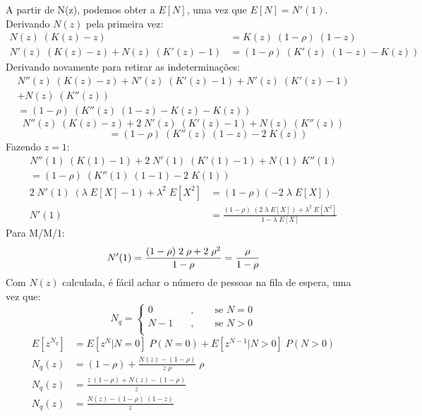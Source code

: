 \documentclass[a4paper]{article}
\newcommand{\E}[1]{E\!\left[#1\right]}
\begin{document}
A partir de N(z),
podemos obter a \(\E{N}\),
uma vez que \(\E{N} = N'(1)\).
Derivando \(N(z)\) pela primeira vez:
\begin{align*}
    N(z) \; (K(z) - z) &= K(z) \; (1 - \rho) \; (1-z) \\
    N'(z) \; (K(z) - z) +  N(z) \; (K'(z) - 1)
        &= (1 - \rho) \; (K'(z) \; (1 - z) - K(z))
\end{align*}
Derivando novamente para retirar as indeterminações:
\begin{align*}
    N''(z) \; (K(z) - z) + N'(z) \; (K'(z) - 1)
        + N'(z) \; (K'(z) - 1) \\
        + N(z) \; (K''(z)) \\
    = (1 - \rho) \; (K''(z) \; (1 - z) - K(z) - K(z))
\end{align*}
\[
   N''(z) \; (K(z) - z) + 2 \; N'(z) \; (K'(z) - 1)
        + N(z) \; (K''(z))
\] \[
    \qquad\qquad \quad
    = (1 - \rho) \; (K''(z) \; (1 - z) - 2 \; K(z))
\]
Fazendo \(z = 1\):
\begin{align*}
    N''(1) \; (K(1) - 1) + 2 \; N'(1) \; (K'(1) - 1)
        + N(1) \; K''(1) \\
        = (1 - \rho) \; (K''(1) \; (1 - 1) - 2 \; K(1))
\end{align*} \begin{align*}
    2 \; N'(1) \; (\lambda \; \E{X} - 1)
        + \lambda^2 \; \E{X^2}
        &= (1 - \rho)(- 2 \; \lambda \; \E{X}) \\
    N'(1) &= \frac{(1 - \rho) \; (2 \; \lambda \; \E{X})
        + \lambda^2 \; \E{X^2}}{1 - \lambda \; \E{X}}
\end{align*}
Para M/M/1:
\[
    N'(1) = \frac{(1 - \rho) \; 2 \; \rho
        + 2 \; \rho^2}{1 - \rho} \\
        = \frac{\rho}{1 - \rho}
\]
Com \(N(z)\) calculada, é fácil achar
o número de pessoas na fila de espera,
uma vez que:
\[
    N_q = \begin{cases}
        0       \quad&, \qquad\text{se } N = 0 \\
        N - 1   \quad&, \qquad\text{se } N > 0 \\
    \end{cases}
\]
\begin{align*}
    \E{z^{N_q}} &= \E{z^N| N = 0} \; P(N = 0)
        + \E{z^{N-1} | N > 0} \;P(N > 0) \\
    N_q(z) &= (1 - \rho) + \frac{N(z) - (1 - \rho)}{z \; \rho}
        \; \rho \\
    N_q(z) &= \frac{z \; (1 - \rho) + N(z) - (1 - \rho)}{z} \\
    N_q(z) &= \frac{N(z) - (1 - \rho) \; (1 - z)}{z} \\
\end{align*}
\end{document}

